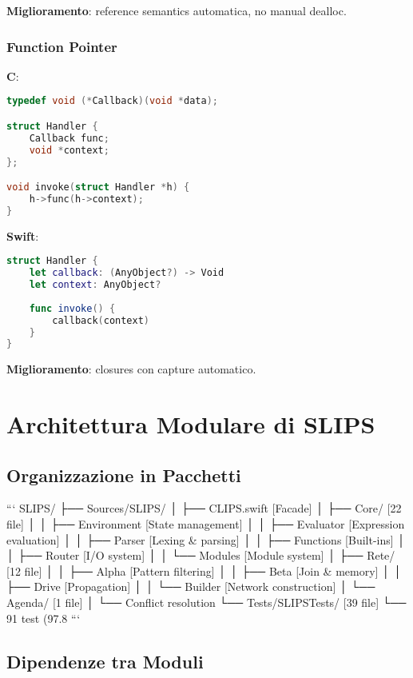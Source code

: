 \textbf{Miglioramento}: reference semantics automatica, no manual dealloc.

\subsubsection{Function Pointer}

\textbf{C}:
\begin{lstlisting}[language=C]
typedef void (*Callback)(void *data);

struct Handler {
    Callback func;
    void *context;
};

void invoke(struct Handler *h) {
    h->func(h->context);
}
\end{lstlisting}

\textbf{Swift}:
\begin{lstlisting}[language=Swift]
struct Handler {
    let callback: (AnyObject?) -> Void
    let context: AnyObject?
    
    func invoke() {
        callback(context)
    }
}
\end{lstlisting}

\textbf{Miglioramento}: closures con capture automatico.

\section{Architettura Modulare di SLIPS}

\subsection{Organizzazione in Pacchetti}

```
SLIPS/
├── Sources/SLIPS/
│   ├── CLIPS.swift           [Facade]
│   ├── Core/                 [22 file]
│   │   ├── Environment       [State management]
│   │   ├── Evaluator         [Expression evaluation]
│   │   ├── Parser            [Lexing & parsing]
│   │   ├── Functions         [Built-ins]
│   │   ├── Router            [I/O system]
│   │   └── Modules           [Module system]
│   ├── Rete/                 [12 file]
│   │   ├── Alpha             [Pattern filtering]
│   │   ├── Beta              [Join & memory]
│   │   ├── Drive             [Propagation]
│   │   └── Builder           [Network construction]
│   └── Agenda/               [1 file]
│       └── Conflict resolution
└── Tests/SLIPSTests/         [39 file]
    └── 91 test (97.8%
```

\subsection{Dipendenze tra Moduli}

